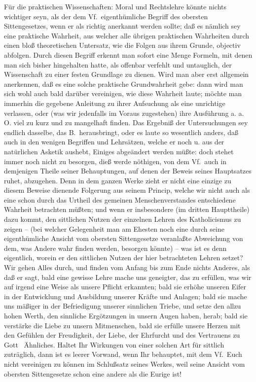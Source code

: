 Für die praktischen Wissenschaften: Moral und Rechtslehre könnte nichts wichtiger seyn, als der dem Vf.\ eigenthümliche Begriff des obersten Sittengesetzes, wenn er als richtig anerkannt werden sollte; daß es nämlich sey eine praktische Wahrheit, aus welcher alle übrigen praktischen Wahrheiten durch einen bloß theoretischen Untersatz, wie die Folgen aus ihrem Grunde, objectiv abfolgen. Durch diesen Begriff erkennt man sofort eine Menge Formeln, mit denen man sich bisher hingehalten hatte, als offenbar verfehlt und  untauglich, der Wissenschaft zu einer festen Grundlage zu dienen. Wird man aber erst allgemein anerkennen, daß es eine solche praktische Grundwahrheit gebe: dann wird man sich wohl auch bald darüber vereinigen, wie diese Wahrheit laute; möchte man immerhin die  gegebene Anleitung zu ihrer Aufsuchung als eine unrichtige verlassen, oder (was wir jedenfalls im Voraus zugestehen) ihre Ausführung a. a. O. viel zu kurz und zu mangelhaft finden. Das Ergebniß der Untersuchungen sey endlich dasselbe, das B.\ herausbringt, oder es laute so wesentlich anders, daß auch in den wenigen Begriffen und Lehrsätzen, welche er noch  u.  aus der natürlichen Asketik aushebt, Einiges abgeändert werden müßte: doch stehet immer noch nicht zu besorgen, dieß werde nöthigen, von dem Vf.\ auch in demjenigen Theile seiner Behauptungen, auf denen der Beweis seines Hauptsatzes ruhet, abzugehen. Denn in dem ganzen Werke zieht er nicht eine einzige zu diesem Beweise dienende Folgerung aus seinem Princip, welche wir nicht auch als eine schon durch das Urtheil des gemeinen Menschenverstandes entschiedene Wahrheit betrachten müßten; und wenn er insbesondere (im dritten Haupttheile) dazu kommt, den sittlichen Nutzen der einzelnen Lehren des Katholicismus zu zeigen -- (bei welcher Gelegenheit man am Ehesten noch eine durch seine eigenthümliche Ansicht vom  obersten Sittengesetze veranlaßte Abweichung von dem, was Andere wahr finden werden, besorgen könnte) -- was ist es denn eigentlich, worein er den sittlichen Nutzen der hier betrachteten Lehren setzet? Wir gehen Alles durch, und finden vom Anfang bis zum Ende nichts Anderes, als daß er sagt, bald eine gewisse Lehre mache uns geneigter, das zu erfüllen, was wir auf irgend eine Weise als unsere Pflicht erkannten; bald sie erhöhe unseren Eifer in der Entwicklung und Ausbildung unserer Kräfte und Anlagen; bald sie mache uns mäßiger in der Befriedigung unserer sinnlichen Triebe, und setze den allzu hohen Werth, den sinnliche Ergötzungen in unsern Augen haben, herab; bald sie verstärke die Liebe zu unsern Mitmenschen, bald sie erfülle unsere Herzen mit den Gefühlen der Freudigkeit, der Liebe, der Ehrfurcht und des Vertrauens zu Gott \ua\  Ähnliches. Haltet Ihr Wirkungen von einer solchen Art für sittlich zuträglich, dann ist es leerer Vorwand, wenn Ihr behauptet, mit dem Vf.\ Euch nicht vereinigen zu können im Schlußsatz seines Werkes, weil seine Ansicht vom obersten Sittengesetze schon eine andere als die Eurige ist! 
